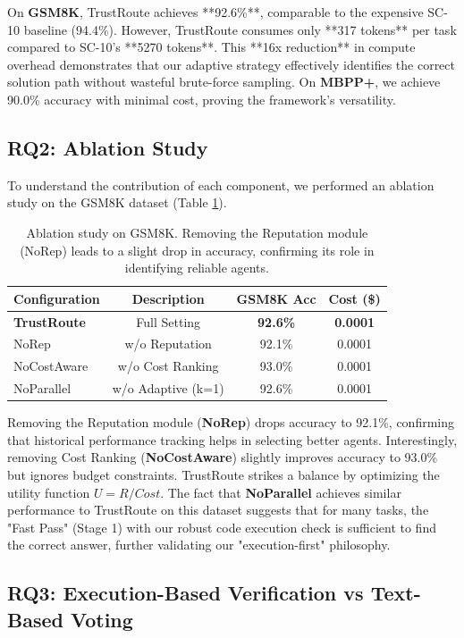 \documentclass[acmsmall,screen,review,anonymous]{acmart}
\begin{document}
On \textbf{GSM8K}, TrustRoute achieves **92.6\%**, comparable to the expensive SC-10 baseline (94.4\%). However, TrustRoute consumes only **317 tokens** per task compared to SC-10's **5270 tokens**. This **16x reduction** in compute overhead demonstrates that our adaptive strategy effectively identifies the correct solution path without wasteful brute-force sampling. On \textbf{MBPP+}, we achieve 90.0\% accuracy with minimal cost, proving the framework's versatility.

\subsection{RQ2: Ablation Study}
To understand the contribution of each component, we performed an ablation study on the GSM8K dataset (Table \ref{tab:ablation}).

\begin{table}[h]
\centering
\caption{Ablation study on GSM8K. Removing the Reputation module (NoRep) leads to a slight drop in accuracy, confirming its role in identifying reliable agents.}
\begin{tabular}{lccc}
\toprule
\textbf{Configuration} & \textbf{Description} & \textbf{GSM8K Acc} & \textbf{Cost (\$)} \\
\midrule
\textbf{TrustRoute} & Full Setting & \textbf{92.6\%} & \textbf{0.0001} \\
NoRep & w/o Reputation & 92.1\% & 0.0001 \\
NoCostAware & w/o Cost Ranking & 93.0\% & 0.0001 \\
NoParallel & w/o Adaptive (k=1) & 92.6\% & 0.0001 \\
\bottomrule
\end{tabular}
\label{tab:ablation}
\end{table}

Removing the Reputation module (\textbf{NoRep}) drops accuracy to 92.1\%, confirming that historical performance tracking helps in selecting better agents. Interestingly, removing Cost Ranking (\textbf{NoCostAware}) slightly improves accuracy to 93.0\% but ignores budget constraints. TrustRoute strikes a balance by optimizing the utility function $U = R / Cost$. The fact that \textbf{NoParallel} achieves similar performance to TrustRoute on this dataset suggests that for many tasks, the "Fast Pass" (Stage 1) with our robust code execution check is sufficient to find the correct answer, further validating our "execution-first" philosophy.

\subsection{RQ3: Execution-Based Verification vs Text-Based Voting}
\label{sec:rq3}
\end{document}
